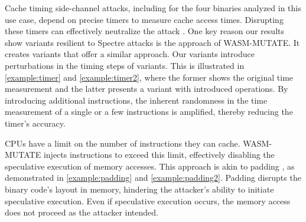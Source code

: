 \begin{strategy}
    Cache timing side-channel attacks, including for the four binaries analyzed in this use case, depend on precise timers to measure cache access times. 
    Disrupting these timers can effectively neutralize the attack \cite{JStimers}.  
    One key reason our results show variants resilient to Spectre attacks is the approach of WASM-MUTATE. 
    It creates variants that offer a similar approach.
    Our \Wasm variants introduce perturbations in the timing steps of \Wasm variants. 
    This is illustrated in \autoref{example:timer} and \autoref{example:timer2}, where the former shows the original time measurement and the latter presents a variant with introduced operations.
    By introducing additional instructions, the inherent randomness in the time measurement of a single or a few instructions is amplified, thereby reducing the timer's accuracy.

\end{strategy}



\begin{strategy}
    CPUs have a limit on the number of instructions they can cache. 
    WASM-MUTATE injects instructions to exceed this limit, effectively disabling the speculative execution of memory accesses.
    This approach is akin to padding \cite{padding}, as demonstrated in \autoref{example:padding} and \autoref{example:padding2}.
    Padding disrupts the binary code's layout in memory, hindering the attacker's ability to initiate speculative execution. 
    Even if speculative execution occurs, the memory access does not proceed as the attacker intended.
    
\end{strategy}





